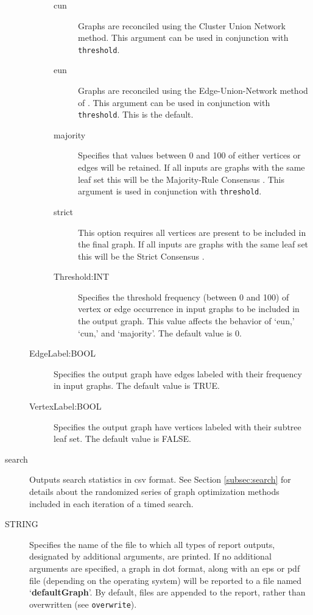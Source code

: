 \begin{description}
\begin{description}
\begin{description}
				\item[cun] Graphs are reconciled using the Cluster Union Network 
				\citep{Baroni2005} method. This argument can be used in conjunction with 
				\texttt{threshold}. 
				
				\item[eun] Graphs are reconciled using the Edge-Union-Network method of 
				\citep{MiyagiandWheeler2019}. This argument can be used in conjunction with 
				\texttt{threshold}. This is the default.
				
				\item[majority] Specifies that values between 0 and 100 of either vertices or 
				edges will be retained. If all inputs are graphs with the same leaf set this will 
				be the Majority-Rule Consensus \citep{MargushandMcMorris1981}. This
				argument is used in conjunction with \texttt{threshold}.

				\item[strict] This option requires all vertices are present to be included in the final graph. 
				If all inputs are graphs with the same leaf set this will be the Strict Consensus 
				\citep{Schuhandpolhemus1980}. 
				
				\item [Threshold:INT] Specifies the threshold frequency (between 0 and 100) 
				of vertex or edge occurrence in input graphs to be included in the output graph. 
				This value affects the behavior of `eun,' `cun,' and `majority'. The 
				default value 	is $0$.

			\end{description}
		
			\item [EdgeLabel:BOOL] Specifies the output graph have edges 
			labeled with their frequency in input graphs. The default value is TRUE.			
			
			\item [VertexLabel:BOOL] Specifies the output graph have vertices 
			labeled with their subtree leaf set. The default value is FALSE.
						
		\end{description}	
				
		\item[search] Outputs search statistics in csv format. See Section 
		\ref{subsec:search} for details about the randomized series of graph 
		optimization methods included in each iteration of a timed search.
			
		\item [STRING] Specifies the name of the file to which all types of report 
		outputs, designated by additional arguments, are printed. If no additional 
		arguments are specified, a graph in dot format, along with an eps or pdf 
		file (depending on the operating system) will be reported to a file named 
		`\textbf{defaultGraph}'. By default, files are appended to the report, rather 
		than overwritten (see \texttt{overwrite}).
				

\end{description}
